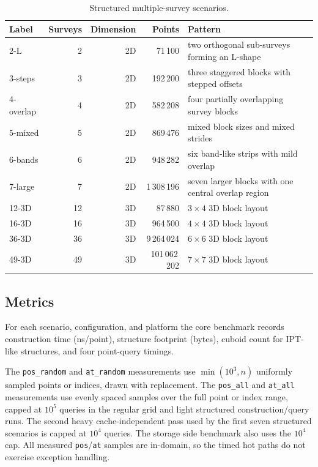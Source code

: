 \documentclass[manuscript,screen,review]{acmart}
\theoremstyle{definition}
\theoremstyle{plain}
\begin{document}
\begin{table}[ht]
\caption{Structured multiple-survey scenarios.}
\label{table:structured-scenarios}
\small
\begin{tabular}{lrrrp{7cm}}
\toprule
Label & Surveys & Dimension & Points & Pattern \\
\midrule
2-L
  & 2 & 2D & 71\,100
  & two orthogonal sub-surveys forming an L-shape \\
3-steps
  & 3 & 2D & 192\,200
  & three staggered blocks with stepped offsets \\
4-overlap
  & 4 & 2D & 582\,208
  & four partially overlapping survey blocks \\
5-mixed
  & 5 & 2D & 869\,476
  & mixed block sizes and mixed strides \\
6-bands
  & 6 & 2D & 948\,282
  & six band-like strips with mild overlap \\
7-large
  & 7 & 2D & 1\,308\,196
  & seven larger blocks with one central overlap region \\
12-3D
  & 12 & 3D & 87\,880
  & $3\times4$ 3D block layout \\
16-3D
  & 16 & 3D & 964\,500
  & $4\times4$ 3D block layout \\
36-3D
  & 36 & 3D & 9\,264\,024
  & $6\times6$ 3D block layout \\
49-3D
  & 49 & 3D & 101\,062\,202
  & $7\times7$ 3D block layout \\
\bottomrule
\end{tabular}
\end{table}

\subsection{Metrics}
\label{section:metrics}

For each scenario, configuration, and platform the core benchmark records
construction time (ns/point), structure footprint (bytes), cuboid count
for IPT-like structures, and four point-query timings.

The \texttt{pos\_random} and \texttt{at\_random} measurements use
$\min(10^3, n)$ uniformly sampled points or indices, drawn with
replacement.
The \texttt{pos\_all} and \texttt{at\_all} measurements use evenly
spaced samples over the full point or index range, capped at $10^5$
queries in the regular grid and light structured construction/query
runs. The second heavy cache-independent pass used by the first seven
structured scenarios is capped at $10^4$ queries. The storage side
benchmark also uses the $10^4$ cap.
All measured \texttt{pos}/\texttt{at} samples are in-domain, so the
timed hot paths do not exercise exception handling.
\end{document}

